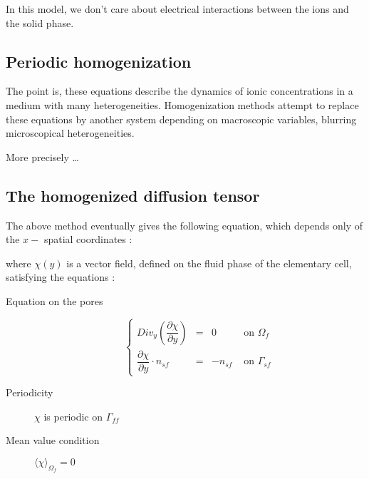 In this model, we don't care about electrical interactions between the ions and the solid phase.

\subsection{Periodic homogenization}

The point is, these equations describe the dynamics of ionic concentrations in a medium with many heterogeneities. %
Homogenization methods attempt to replace these equations by another system depending on macroscopic variables, %
\og{} blurring \fg{} microscopical heterogeneities.

\par
More precisely \dots











\subsection{The homogenized diffusion tensor}


The above method eventually gives the following equation, which depends only of the $x-$ spatial coordinates :








where $\chi(y)$ is a vector field, defined on the fluid phase of the elementary cell, satisfying the equations :

\begin{description}
\item[Equation on the pores] 
\begin{equation}\label{chistr}
\left\{%
\begin{array}{lccr}
Div_y \left( \dfrac{\partial{\chi}}{\partial{y}}\right) &=& 0&\text{ on }\Omega_f \\
\dfrac{\partial{\chi}}{\partial{y}} \cdot n_{sf}&=&-n_{sf}&\text{ on }\Gamma_{sf}
\end{array}
\right.
\end{equation}
\item[Periodicity] $\chi$ is periodic on $\Gamma_{ff}$
\item[Mean value condition] $\langle\chi\rangle_{\Omega_f}=0$
\end{description}

